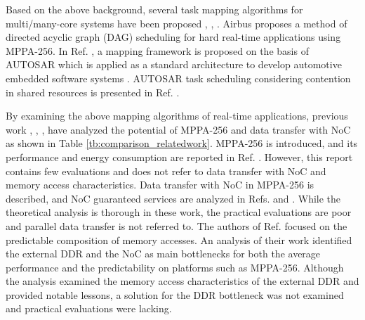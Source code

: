 \documentclass[conference,compsoc]{IEEEtran}
\begin{document}
Based on the above background, several task mapping algorithms for multi/many-core systems have been proposed \cite{carle2014static}, \cite{faragardi2014communication}, \cite{perret2016mapping}.
Airbus \cite{perret2016mapping} proposes a method of directed acyclic graph (DAG) scheduling for hard real-time applications using MPPA-256.
In Ref. \cite{faragardi2014communication}, a mapping framework is proposed on the basis of AUTOSAR which is applied as a standard architecture to develop automotive embedded software systems \cite{furst2009autosar}.
AUTOSAR task scheduling considering contention in shared resources is presented in Ref. \cite{becker2016contention}.

By examining the above mapping algorithms of real-time applications, previous work \cite{deDinechin2014GSN}, \cite{denet2017work}, \cite{kanter2015kalray}, \cite{perret2016predictable} have analyzed the potential of MPPA-256 and data transfer with NoC as shown in Table \ref{tb:comparison_relatedwork}.
MPPA-256 is introduced, and its performance and energy consumption are reported in Ref. \cite{kanter2015kalray}.
However, this report contains few evaluations and does not refer to data transfer with NoC and memory access characteristics.
Data transfer with NoC in MPPA-256 is described, and NoC guaranteed services are analyzed in Refs. \cite{deDinechin2014GSN} and \cite{denet2017work}.
While the theoretical analysis is thorough in these work, the practical evaluations are poor and parallel data transfer is not referred to.
The authors of Ref. \cite{perret2016predictable} focused on the predictable composition of memory accesses.
An analysis of their work identified the external DDR and the NoC as main bottlenecks for both the average performance and the predictability on platforms such as MPPA-256.
Although the analysis examined the memory access characteristics of the external DDR and provided notable lessons, a solution for the DDR bottleneck was not examined and practical evaluations were lacking.
\end{document}

